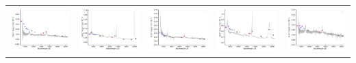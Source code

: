\begin{center}
\begin{longtable}{l l l l l }
    \includegraphics[width=0.19\linewidth, clip]{Figs/Figs-sdss/spec-9406-58067-0121-STRIPE82-0007-021121.pdf} & \includegraphics[width=0.19\linewidth, clip]{Figs/Figs-sdss/spec-9406-58067-0648-STRIPE82-0006-027457.pdf} & \includegraphics[width=0.19\linewidth, clip]{Figs/Figs-sdss/spec-9406-58067-0764-STRIPE82-0008-036347.pdf} & \includegraphics[width=0.19\linewidth, clip]{Figs/Figs-sdss/spec-9407-58041-0415-STRIPE82-0004-031191.pdf} & \includegraphics[width=0.19\linewidth, clip]{Figs/Figs-sdss/spec-9409-58051-0225-STRIPE82-0015-053521.pdf} \\

\end{longtable}
\end{center}
